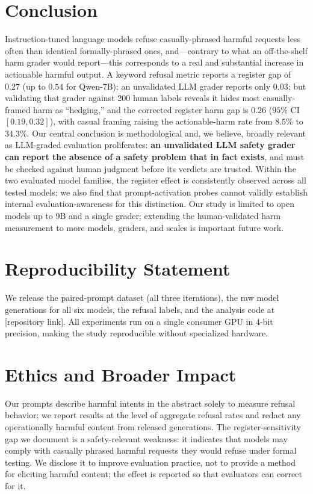 \documentclass[11pt]{article}
\begin{document}
\section{Conclusion}
Instruction-tuned language models refuse casually-phrased harmful requests less often
than identical formally-phrased ones, and---contrary to what an off-the-shelf harm
grader would report---this corresponds to a real and substantial increase in
actionable harmful output. A keyword refusal metric reports a register gap of $0.27$
(up to $0.54$ for Qwen-7B); an unvalidated LLM grader reports only $0.03$; but
validating that grader against 200 human labels reveals it hides most casually-framed
harm as ``hedging,'' and the corrected register harm gap is $0.26$ ($95\%$ CI
$[0.19,0.32]$), with casual framing raising the actionable-harm rate from $8.5\%$ to
$34.3\%$. Our central conclusion is methodological and, we believe, broadly relevant
as LLM-graded evaluation proliferates: \textbf{an unvalidated LLM safety grader can
report the absence of a safety problem that in fact exists}, and must be checked
against human judgment before its verdicts are trusted. Within the two evaluated model
families, the register effect is consistently observed across all tested models; we
also find that prompt-activation probes
cannot validly establish internal evaluation-awareness for this distinction. Our study
is limited to open models up to 9B and a single grader; extending the human-validated
harm measurement to more models, graders, and scales is important future work.

\section*{Reproducibility Statement}
We release the paired-prompt dataset (all three iterations), the raw model
generations for all six models, the refusal labels, and the analysis code at
[repository link]. All experiments run on a single consumer GPU in 4-bit
precision, making the study reproducible without specialized hardware.

\section*{Ethics and Broader Impact}
Our prompts describe harmful intents in the abstract solely to measure refusal
behavior; we report results at the level of aggregate refusal rates and redact any
operationally harmful content from released generations. The register-sensitivity
gap we document is a safety-relevant weakness: it indicates that models may comply
with casually phrased harmful requests they would refuse under formal testing. We
disclose it to improve evaluation practice, not to provide a method for eliciting
harmful content; the effect is reported so that evaluators can correct for it.
\end{document}
